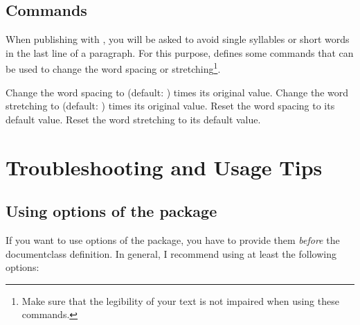 \subsection{Commands}

When publishing with \KSP, you will be asked to avoid single syllables or short words in the last line of a paragraph. For this purpose,  defines some commands that can be used to change the word spacing or stretching\footnote{Make sure that the legibility of your text is not impaired when using these commands.}.
\begin{commandlist}
    Change the word spacing to  (default: ) times its original value.
    Change the word stretching to  (default: ) times its original value.
    Reset the word spacing to its default value.
    Reset the word stretching to its default value.
\end{commandlist}

\section{Troubleshooting and Usage Tips}

\subsection{Using options of the  package}

If you want to use options of the  package, you have to provide them \emph{before} the documentclass definition. In general, I recommend using at least the following options:


